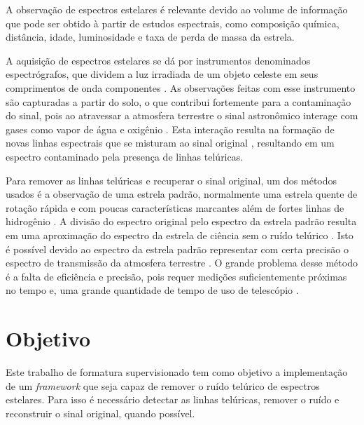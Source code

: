 \documentclass[11pt,twoside,a4paper]{article}
\begin{document}
A observação de espectros estelares é relevante devido ao volume de informação que pode ser obtido à partir de estudos espectrais, como composição química, distância, idade, luminosidade e taxa de perda de massa da estrela\cite{wiki:astro_spectroscopy}.

\par A aquisição de espectros estelares se dá por instrumentos denominados espectrógrafos, que dividem a luz irradiada de um objeto celeste em seus comprimentos de onda componentes \cite{spectrograph_aus}. As observações feitas com esse instrumento são capturadas a partir do solo, o que contribui fortemente para a contaminação do sinal, pois ao atravessar a atmosfera terrestre o sinal astronômico interage com gases como vapor de água e oxigênio \cite{seifahrt2010precise}. Esta interação resulta na formação de novas linhas espectrais que se misturam ao sinal original \cite{catanzaro1997high}, resultando em um espectro contaminado pela presença de linhas telúricas. 

\par Para remover as linhas telúricas e recuperar o sinal original, um dos métodos usados é a observação de uma estrela padrão, normalmente uma estrela quente de rotação rápida e com poucas características marcantes além de fortes linhas de hidrogênio \cite{seifahrt2010precise}. A divisão do espectro original pelo espectro da estrela padrão resulta em uma aproximação do espectro da estrela de ciência sem o ruído telúrico \cite{rudolf2016modelling}. Isto é possível devido ao espectro da estrela padrão representar com certa precisão o espectro de transmissão da atmosfera terrestre \cite{ulmer2019telluric}. O grande problema desse método é a falta de eficiência e precisão, pois requer medições suficientemente próximas no tempo e, uma grande quantidade de tempo de uso de telescópio \cite{seifahrt2010precise}. 

\section{Objetivo}
\doublespacing
Este trabalho de formatura supervisionado tem como objetivo a implementação  de um \textit{framework} que seja capaz de remover o ruído telúrico de espectros estelares. Para isso é necessário detectar as linhas telúricas, remover o ruído e reconstruir o sinal original, quando possível. 
\end{document}
